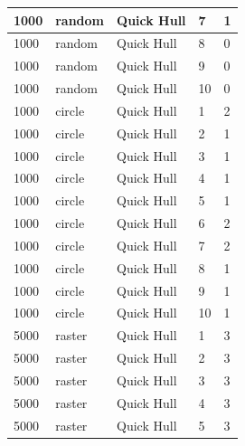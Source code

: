 \documentclass[12pt]{article}
\begin{document}
\begin{longtable}{|l|l|l|l|l|}
1000         & random            & Quick Hull & 7          & 1                             \\ \hline
1000         & random            & Quick Hull & 8          & 0                             \\ \hline
1000         & random            & Quick Hull & 9          & 0                             \\ \hline
1000         & random            & Quick Hull & 10         & 0                             \\ \hline
1000         & circle            & Quick Hull & 1          & 2                             \\ \hline
1000         & circle            & Quick Hull & 2          & 1                             \\ \hline
1000         & circle            & Quick Hull & 3          & 1                             \\ \hline
1000         & circle            & Quick Hull & 4          & 1                             \\ \hline
1000         & circle            & Quick Hull & 5          & 1                             \\ \hline
1000         & circle            & Quick Hull & 6          & 2                             \\ \hline
1000         & circle            & Quick Hull & 7          & 2                             \\ \hline
1000         & circle            & Quick Hull & 8          & 1                             \\ \hline
1000         & circle            & Quick Hull & 9          & 1                             \\ \hline
1000         & circle            & Quick Hull & 10         & 1                             \\ \hline
5000         & raster            & Quick Hull & 1          & 3                             \\ \hline
5000         & raster            & Quick Hull & 2          & 3                             \\ \hline
5000         & raster            & Quick Hull & 3          & 3                             \\ \hline
5000         & raster            & Quick Hull & 4          & 3                             \\ \hline
5000         & raster            & Quick Hull & 5          & 3                             \\ \hline

\end{longtable}
\end{document}
